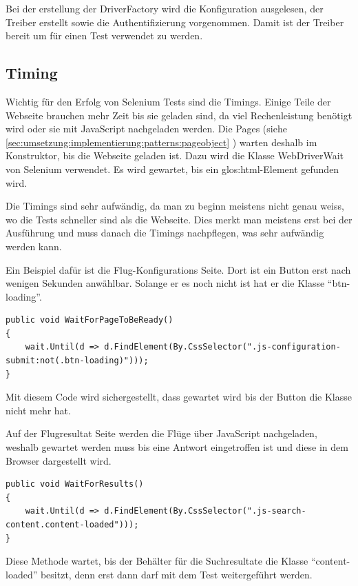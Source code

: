 Bei der erstellung der DriverFactory wird die Konfiguration ausgelesen, der Treiber erstellt sowie die Authentifizierung vorgenommen. Damit ist der Treiber bereit um für einen Test verwendet zu werden.

\subsection{Timing}
\label{sec:umsetzung:Implementierung:Architektur:Timing}
Wichtig für den Erfolg von Selenium Tests sind die Timings. Einige Teile der Webseite brauchen mehr Zeit bis sie geladen sind, da viel Rechenleistung benötigt wird oder sie mit JavaScript nachgeladen werden. Die Pages (siehe \cref{sec:umsetzung:implementierung:patterns:pageobject} ) warten deshalb im Konstruktor, bis die Webseite geladen ist. Dazu wird die Klasse WebDriverWait von Selenium verwendet. Es wird gewartet, bis ein \Gls{glos:html}-Element gefunden wird.

Die Timings sind sehr aufwändig, da man zu beginn meistens nicht genau weiss, wo die Tests schneller sind als die Webseite. Dies merkt man meistens erst bei der Ausführung und muss danach die Timings nachpflegen, was sehr aufwändig werden kann.

Ein Beispiel dafür ist die Flug-Konfigurations Seite. Dort ist ein Button erst nach wenigen Sekunden anwählbar.
Solange er es noch nicht ist hat er die Klasse "`btn-loading"'. 

\lstset{language=csh}
\begin{lstlisting}
public void WaitForPageToBeReady()
{
    wait.Until(d => d.FindElement(By.CssSelector(".js-configuration-submit:not(.btn-loading)")));
}
\end{lstlisting}

Mit diesem Code wird sichergestellt, dass gewartet wird bis der Button die Klasse nicht mehr hat.

Auf der Flugresultat Seite werden die Flüge über JavaScript nachgeladen, weshalb gewartet werden muss bis eine Antwort eingetroffen ist und diese in dem Browser dargestellt wird.

\begin{lstlisting}
public void WaitForResults()
{
    wait.Until(d => d.FindElement(By.CssSelector(".js-search-content.content-loaded")));
}
\end{lstlisting}

Diese Methode wartet, bis der Behälter für die Suchresultate die Klasse "`content-loaded"' besitzt, denn erst dann darf mit dem Test weitergeführt werden.

